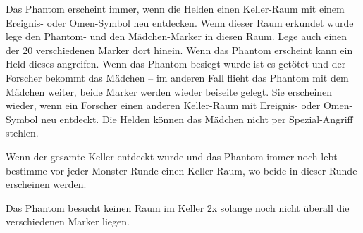 
  \begin{itemize}
        \bitem Das Phantom erscheint immer, wenn die Helden einen Keller-Raum mit einem Ereignis- oder Omen-Symbol neu entdecken. Wenn dieser Raum erkundet wurde lege den Phantom- und den Mädchen-Marker in diesen Raum.
Lege auch einen der 20 verschiedenen Marker dort hinein.
        \bitem Wenn das Phantom erscheint kann ein Held dieses angreifen. Wenn das Phantom besiegt wurde ist es getötet und der Forscher bekommt das Mädchen – im anderen Fall flieht das Phantom mit dem Mädchen weiter, beide Marker werden wieder beiseite gelegt. Sie erscheinen wieder, wenn ein Forscher einen anderen Keller-Raum mit Ereignis- oder Omen- Symbol neu entdeckt.
        \bitem Die Helden können das Mädchen nicht per Spezial-Angriff stehlen.

        \bitem Wenn der gesamte Keller entdeckt wurde und das Phantom immer noch lebt bestimme vor jeder Monster-Runde einen Keller-Raum, wo beide in dieser Runde erscheinen werden.

        \bitem Das Phantom besucht keinen Raum im Keller 2x solange noch nicht überall die verschiedenen Marker liegen.
    \end{itemize}


